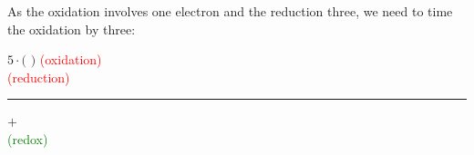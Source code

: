 \documentclass[main.tex]{subfiles} %
\begin{document}
\begin{description}
\begin{center}\end{center}
As the oxidation involves one electron and the reduction three, we need to time the oxidation by three:
 \begin{center}
$5\cdot \big($  $\big)$ \hspace*{0pt}\hfill  \textcolor{red}{ (oxidation) }\\
   \hspace*{0pt}\hfill  \textcolor{red}{ (reduction) } \\
\rule{12cm}{0.4pt}$+$\\
{\raggedleft {} \hspace*{0pt}\hfill  \textcolor{green}{ (redox) } }  \\ 
\hspace*{\fill}
 \end{center}


\end{description}
\end{document}
